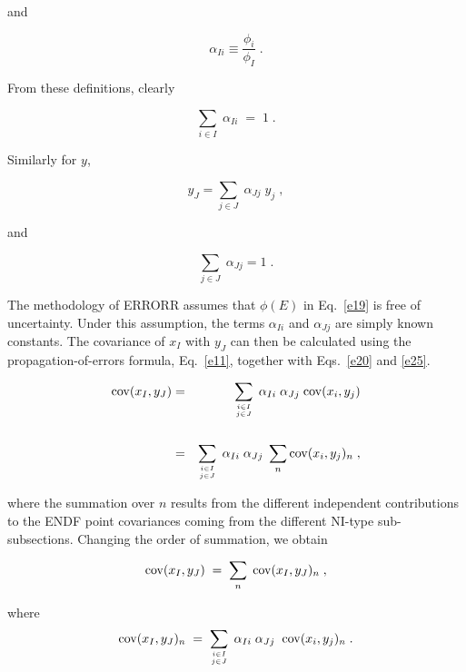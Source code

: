 \noindent
and

\begin{equation}
\alpha_{Ii} \equiv \frac{\phi_i}{\phi_I} \; .
\end{equation}

\noindent
From these definitions, clearly

\begin {equation}
\sum_{i\in I}\; \alpha_{Ii} \; = \; 1 \; .
\label{e24}
\end{equation}

\noindent
Similarly for $y$,

\begin{equation}
y_J = \sum_{j\in J} \; \alpha_{Jj} \; y_j\;,
\label{e25}
\end{equation}

\noindent
and

\begin{equation}
\sum_{j \in J} \; \alpha_{Jj} = 1 \;.
\label{e26}
\end{equation}

The methodology of ERRORR assumes that $\phi(E)$ in Eq.~\ref{e19} is
free of uncertainty.  Under this assumption, the terms $\alpha_{Ii}$
and $\alpha_{Jj}$ are simply known constants.  The covariance of $x_I$
with $y_J$ can then be calculated using the propagation-of-errors
formula, Eq.~\ref{e11}, together with Eqs.~\ref{e20} and \ref{e25}.

\begin{eqnarray}
{\rm {\rm cov}} (x_I,y_J) & = & \sum_{i\in I\atop{j\in J}}\;
  \alpha_{Ii} \; \alpha_{Jj} \; {\rm cov}
 (x_i ,y_j) \nonumber \\
\nonumber \\
 & = & \sum_{i\in I\atop{j\in J}}\; \alpha_{Ii} \; \alpha_{Jj} \; \sum_{n}{\rm
 cov} (x_i ,y_j)_n \; ,
\end{eqnarray}

\noindent
where the summation over $n$ results from the different independent
contributions to the ENDF point covariances coming from the different
NI-type sub-subsections.  Changing the order of summation, we obtain

\begin{equation}
{\rm  cov} (x_I,y_J) \; = \; \sum_{n} \; {\rm cov} (x_I,y_J)_n \; ,
\label{e28}
\end{equation}

\noindent
where
\begin{equation}
{\rm cov} (x_I,y_J)_n \;=\; \sum_{i\in I\atop{j\in J}} \; \alpha_{Ii}\;
\alpha_{Jj}\;\; {\rm {\rm cov}} (x_i,y_j)_n \; .
\label{e29}
\end{equation}

